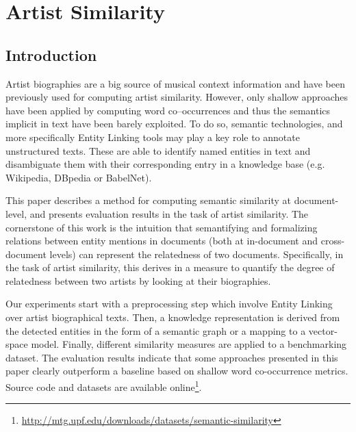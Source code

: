 
\chapter{Artist Similarity}
\label{sec:similarity}

\section{Introduction}\label{sec:introduction} %

Artist biographies are a big source of musical context information and have been previously used for computing artist similarity. However, only shallow approaches have been applied by computing word co--occurrences and thus the semantics implicit in text have been barely exploited. To do so, semantic technologies, and more specifically Entity Linking tools may play a key role to annotate unstructured texts. These are able to identify named entities in text and disambiguate them with their corresponding entry in a knowledge base (e.g. Wikipedia, DBpedia or BabelNet).

This paper describes a method for computing semantic similarity at document-level, and presents evaluation results in the task of artist similarity. The cornerstone of this work is the intuition that semantifying and formalizing relations between entity mentions in documents (both at in-document and cross-document levels) can represent the relatedness of two documents. Specifically, in the task of artist similarity, this derives in a measure to quantify the degree of relatedness between two artists by looking at their biographies.

Our experiments start with a preprocessing step which involve Entity Linking over artist biographical texts. %
Then, a knowledge representation is derived from the detected entities in the form of a semantic graph or a mapping to a vector-space model.
Finally, different similarity measures are applied to a benchmarking dataset. The evaluation results indicate that some approaches presented in this paper clearly outperform a baseline based on shallow word co-occurrence metrics.
Source code and datasets are available online\footnote{\url{http://mtg.upf.edu/downloads/datasets/semantic-similarity}}.

